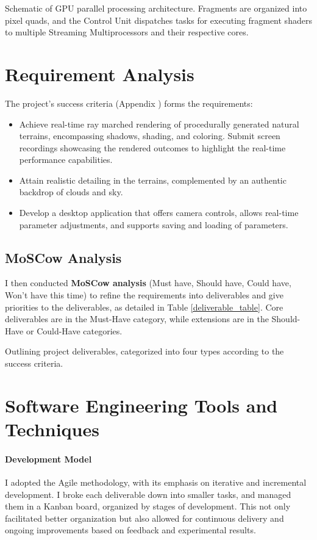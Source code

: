 {Schematic of GPU parallel processing architecture. Fragments are organized into pixel quads, and the Control Unit dispatches tasks for executing fragment shaders to multiple Streaming Multiprocessors and their respective cores.}

\section{Requirement Analysis}
\label{sec:Requirement}

The project’s success criteria (Appendix ) forms the requirements:

\begin{itemize}
    \item Achieve real-time ray marched rendering of procedurally generated natural terrains, encompassing shadows, shading, and coloring. Submit screen recordings showcasing the rendered outcomes to highlight the real-time performance capabilities.
    \item Attain realistic detailing in the terrains, complemented by an authentic backdrop of clouds and sky.
    \item Develop a desktop application that offers camera controls, allows real-time parameter adjustments, and supports saving and loading of parameters.
\end{itemize}

\subsection{MoSCow Analysis}

I then conducted \textbf{MoSCow analysis} (Must have, Should have, Could have, Won't have this time) to refine the requirements into deliverables and give priorities to the deliverables, as detailed in Table \ref{deliverable_table}. Core deliverables are in the Must-Have category, while extensions are in the Should-Have or Could-Have categories. 

{Outlining project deliverables, categorized into four types according to the success criteria.}

\section{Software Engineering Tools and Techniques}
\label{sec:Software Engineering}

\paragraph{Development Model}
I adopted the Agile methodology, with its emphasis on iterative and incremental development. I broke each deliverable down into smaller tasks, and managed them in a Kanban board, organized by stages of development. This not only facilitated better organization but also allowed for continuous delivery and ongoing improvements based on feedback and experimental results.

